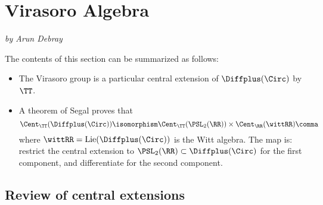 
\section{Virasoro Algebra}\label{VirasoroAlgebra}
\textit{by Arun Debray}

The contents of this section can be summarized as follows:
\begin{itemize}
	\item The Virasoro group is a particular central extension of $\Diffplus(\Circ)$ by $\TT$.
	\item A theorem of Segal \cite[Corollary 7.5]{Seg81} proves that
	\begin{equation}
		\Cent_{\TT}(\Diffplus(\Circ)) \isomorphism \Cent_{\TT}(\PSL_2(\RR))\times\Cent_\RR(\wittRR) \comma
	\end{equation}
	where $\wittRR = \mathrm{Lie}(\Diffplus(\Circ))$ is the Witt algebra. The map is: restrict the central extension to
	$\PSL_2(\RR)\subset\Diffplus(\Circ)$ for the first component, and differentiate for the second component.
\end{itemize}


\subsection{Review of central extensions}

